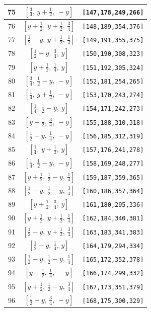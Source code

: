 \documentclass[fleqn,8pt]{jsarticle}
\begin{document}
\begin{longtable}{ccc}
75 & $\left[ \frac{3}{4},\, y + \frac{1}{2},\, - y \right]$ & {\tt [147,178,249,266]} \\ \hline
76 & $\left[ y + \frac{1}{2},\, y + \frac{1}{2},\, \frac{3}{4} \right]$ & {\tt [148,189,354,376]} \\ \hline
77 & $\left[ \frac{1}{2} - y,\, y + \frac{1}{2},\, \frac{1}{4} \right]$ & {\tt [149,191,355,375]} \\ \hline
78 & $\left[ \frac{1}{2} - y,\, \frac{3}{4},\, y \right]$ & {\tt [150,190,308,323]} \\ \hline
79 & $\left[ y + \frac{1}{2},\, \frac{1}{4},\, y \right]$ & {\tt [151,192,305,324]} \\ \hline
80 & $\left[ \frac{3}{4},\, \frac{1}{2} - y,\, - y \right]$ & {\tt [152,181,254,265]} \\ \hline
81 & $\left[ \frac{1}{4},\, y + \frac{1}{2},\, - y \right]$ & {\tt [153,170,243,274]} \\ \hline
82 & $\left[ \frac{1}{4},\, \frac{1}{2} - y,\, y \right]$ & {\tt [154,171,242,273]} \\ \hline
83 & $\left[ y + \frac{1}{2},\, \frac{3}{4},\, - y \right]$ & {\tt [155,188,310,318]} \\ \hline
84 & $\left[ \frac{1}{2} - y,\, \frac{1}{4},\, - y \right]$ & {\tt [156,185,312,319]} \\ \hline
85 & $\left[ \frac{1}{4},\, y + \frac{1}{2},\, y \right]$ & {\tt [157,176,241,278]} \\ \hline
86 & $\left[ \frac{1}{4},\, \frac{1}{2} - y,\, - y \right]$ & {\tt [158,169,248,277]} \\ \hline
87 & $\left[ y + \frac{1}{2},\, \frac{1}{2} - y,\, \frac{1}{4} \right]$ & {\tt [159,187,359,365]} \\ \hline
88 & $\left[ \frac{1}{2} - y,\, \frac{1}{2} - y,\, \frac{3}{4} \right]$ & {\tt [160,186,357,364]} \\ \hline
89 & $\left[ y + \frac{1}{2},\, \frac{3}{4},\, y \right]$ & {\tt [161,180,295,336]} \\ \hline
90 & $\left[ y + \frac{1}{2},\, y + \frac{1}{2},\, \frac{1}{4} \right]$ & {\tt [162,184,340,381]} \\ \hline
91 & $\left[ \frac{1}{2} - y,\, y + \frac{1}{2},\, \frac{3}{4} \right]$ & {\tt [163,183,341,383]} \\ \hline
92 & $\left[ \frac{1}{2} - y,\, \frac{1}{4},\, y \right]$ & {\tt [164,179,294,334]} \\ \hline
93 & $\left[ \frac{1}{2} - y,\, \frac{1}{2} - y,\, \frac{1}{4} \right]$ & {\tt [165,172,352,378]} \\ \hline
94 & $\left[ y + \frac{1}{2},\, \frac{1}{4},\, - y \right]$ & {\tt [166,174,299,332]} \\ \hline
95 & $\left[ y + \frac{1}{2},\, \frac{1}{2} - y,\, \frac{3}{4} \right]$ & {\tt [167,173,351,379]} \\ \hline
96 & $\left[ \frac{1}{2} - y,\, \frac{3}{4},\, - y \right]$ & {\tt [168,175,300,329]} \\
\end{longtable}
\end{document}

